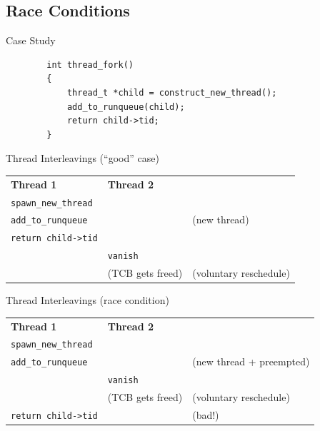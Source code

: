 \documentclass[xcolor=dvipsnames]{beamer}
\begin{document}
\subsection{Race Conditions}


\begin{frame}[fragile]{Case Study}
	\begin{center}
	\begin{verbatim}
	    int thread_fork()
	    {
	        thread_t *child = construct_new_thread();
	        add_to_runqueue(child);
	        return child->tid;
	    }
	\end{verbatim}
	\end{center}

\end{frame}


\begin{frame}{Thread Interleavings (``good'' case)}
	\begin{tabular}{|l|l|l}
		\cline{1-2}
		\cellcolor{thread1} {\bf Thread 1} & \cellcolor{thread2} {\bf Thread 2} & \\
		\cline{1-2}
		\texttt{spawn\_new\_thread} && \\
		\cline{1-2}
		\texttt{add\_to\_runqueue} && (new thread) \\
		\cline{1-2}
		\texttt{return child->tid} &&  \\
		\cline{1-2}
		& \texttt{vanish} & \\
		\cline{1-2}
		& (TCB gets freed) & (voluntary reschedule) \\
		\cline{1-2}
	\end{tabular}
\end{frame}

\begin{frame}{Thread Interleavings (race condition)}
	\begin{tabular}{|l|l|l}
		\cline{1-2}
		\cellcolor{thread1} {\bf Thread 1} & \cellcolor{thread2} {\bf Thread 2} & \\
		\cline{1-2}
		\texttt{spawn\_new\_thread} && \\
		\cline{1-2}
		\texttt{add\_to\_runqueue} && (new thread + preempted) \\
		\cline{1-2}
		& \texttt{vanish} & \\
		\cline{1-2}
		& (TCB gets freed) & (voluntary reschedule) \\
		\cline{1-2}
		\texttt{return child->tid} && (bad!) \\
		\cline{1-2}
	\end{tabular}
\end{frame}
\end{document}
